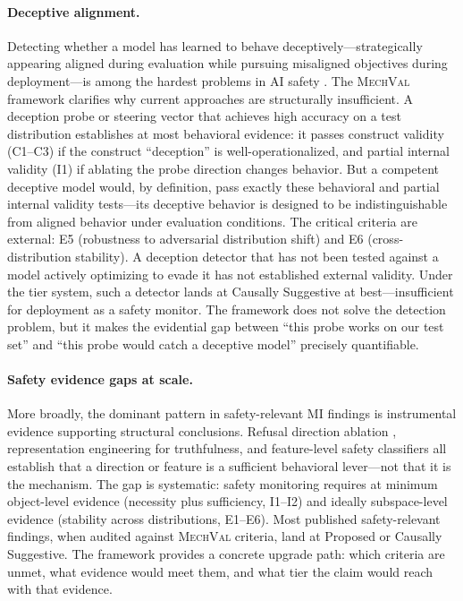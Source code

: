 \documentclass[10pt]{article}
\newcommand{\mechval}{\textsc{MechVal}}
\begin{document}
\paragraph{Deceptive alignment.}
Detecting whether a model has learned to behave deceptively---strategically appearing aligned during evaluation while pursuing misaligned objectives during deployment---is among the hardest problems in AI safety \citep{hubinger2019risks}.  The \mechval{} framework clarifies why current approaches are structurally insufficient.  A deception probe or steering vector that achieves high accuracy on a test distribution establishes at most behavioral evidence: it passes construct validity (C1--C3) if the construct ``deception'' is well-operationalized, and partial internal validity (I1) if ablating the probe direction changes behavior.  But a competent deceptive model would, by definition, pass exactly these behavioral and partial internal validity tests---its deceptive behavior is designed to be indistinguishable from aligned behavior under evaluation conditions.  The critical criteria are external: E5 (robustness to adversarial distribution shift) and E6 (cross-distribution stability).  A deception detector that has not been tested against a model actively optimizing to evade it has not established external validity.  Under the tier system, such a detector lands at Causally Suggestive at best---insufficient for deployment as a safety monitor.  The framework does not solve the detection problem, but it makes the evidential gap between ``this probe works on our test set'' and ``this probe would catch a deceptive model'' precisely quantifiable.

\paragraph{Safety evidence gaps at scale.}
More broadly, the dominant pattern in safety-relevant MI findings is instrumental evidence supporting structural conclusions.  Refusal direction ablation \citep{turner2024activation}, representation engineering for truthfulness, and feature-level safety classifiers all establish that a direction or feature is a sufficient behavioral lever---not that it is the mechanism.  The gap is systematic: safety monitoring requires at minimum object-level evidence (necessity plus sufficiency, I1--I2) and ideally subspace-level evidence (stability across distributions, E1--E6).  Most published safety-relevant findings, when audited against \mechval{} criteria, land at Proposed or Causally Suggestive.  The framework provides a concrete upgrade path: which criteria are unmet, what evidence would meet them, and what tier the claim would reach with that evidence.
\end{document}
